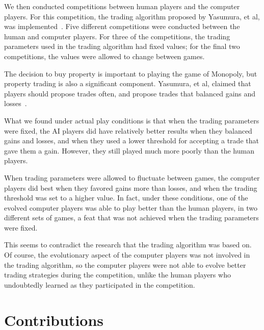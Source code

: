 We then conducted competitions between human players and the computer players.
For this competition, the trading algorithm proposed by Yasumura, et al, was
implemented~\cite{Yasumura2001Negotiate}. Five different competitions were
conducted between the human and computer players. For three of the competitions,
the trading parameters used in the trading algorithm had fixed values; for the
final two competitions, the values were allowed to change between games. 

The decision to buy property is important to playing the game of Monopoly, but
property trading is also a significant component. Yasumura, et al, claimed that
players should propose trades often, and propose trades that balanced gains and
losses~\cite{Yasumura2001Negotiate}.

What we found under actual play conditions is that when the trading parameters
were fixed, the AI players did have relatively better results when they balanced
gains and losses, and when they used a lower threshold for accepting a trade
that gave them a gain. However, they still played much more poorly than the
human players.

When trading parameters were allowed to fluctuate between games, the computer
players did best when they favored gains more than losses, and when the trading
threshold was set to a higher value. In fact, under these conditions, one of the
evolved computer players was able to play better than the human players, in two
different sets of games, a feat that was not achieved when the trading
parameters were fixed.

This seems to contradict the research that the trading algorithm was based on.
Of course, the evolutionary aspect of the computer players was not involved in
the trading algorithm, so the computer players were not able to evolve better
trading strategies during the competition, unlike the human players who
undoubtedly learned as they participated in the competition.

\section{Contributions}

